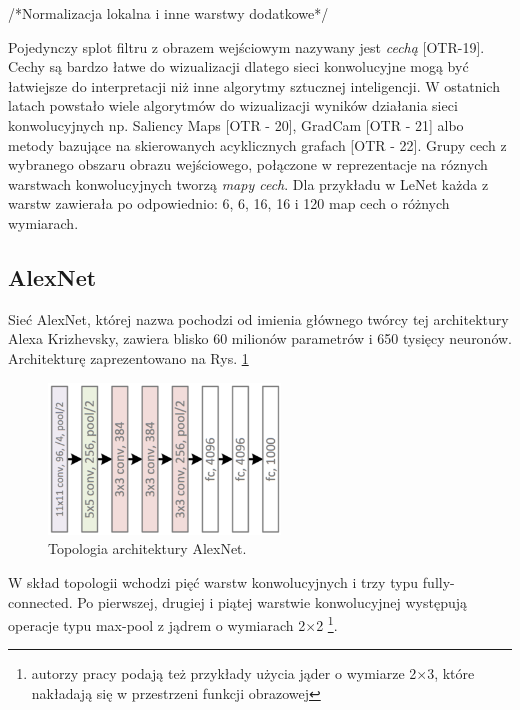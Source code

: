 /*Normalizacja lokalna i inne warstwy dodatkowe*/

Pojedynczy splot filtru z obrazem wejściowym nazywany jest \textit{cechą} [OTR-19]. Cechy są bardzo łatwe do wizualizacji dlatego sieci konwolucyjne mogą być łatwiejsze do interpretacji niż inne algorytmy sztucznej inteligencji. W ostatnich latach powstało wiele algorytmów do wizualizacji wyników działania sieci konwolucyjnych np. Saliency Maps [OTR - 20], GradCam [OTR - 21] albo metody bazujące na skierowanych acyklicznych grafach [OTR - 22]. Grupy cech z wybranego obszaru obrazu wejściowego, połączone w reprezentacje na róznych warstwach konwolucyjnych tworzą \textit{mapy cech}. Dla przykładu w LeNet każda z warstw zawierała po odpowiednio: 6, 6, 16, 16 i 120 map cech o różnych wymiarach. 

\subsection{AlexNet}
\label{AlexNet}
Sieć AlexNet, której nazwa pochodzi od imienia głównego twórcy tej architektury Alexa Krizhevsky, zawiera blisko 60 milionów parametrów i 650 tysięcy neuronów. Architekturę zaprezentowano na Rys. \ref{AlexNetTopology}
\begin{figure}[h!]
	\centering
	\includegraphics[width=0.55\textwidth]{figures/AlexNet.png}
	\caption{Topologia architektury AlexNet.}
	\label{AlexNetTopology}
\end{figure}

W skład topologii wchodzi pięć warstw konwolucyjnych i trzy typu fully-connected. Po pierwszej, drugiej i piątej warstwie konwolucyjnej występują operacje typu max-pool z jądrem o wymiarach 2$\times$2 \footnote{autorzy pracy podają też przykłady użycia jąder o wymiarze 2$\times$3, które nakładają się w przestrzeni funkcji obrazowej}. 


